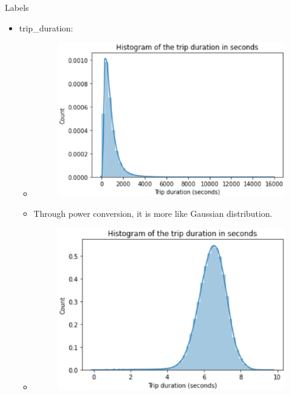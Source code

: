 \documentclass[
 size=14pt,
 paper=smartboard,  %
 mode=present, 		%
 display=slides, 	%
 style=tuliplab,  	%
 pauseslide,
 fleqn,leqno]{powerdot}
\begin{document}
\begin{slide}{Labels}
  \begin{itemize}
  \item trip_duration:
  \begin{itemize}
    \item \begin{figure}\includegraphics[scale=0.3]{figures/17.eps}\end{figure}
    \item Through power conversion, it is more like Gaussian distribution.
    \item \begin{figure}\includegraphics[scale=0.3]{figures/18.eps}\end{figure}
  \end{itemize}
\end{itemize}
\end{slide}
\end{document}
